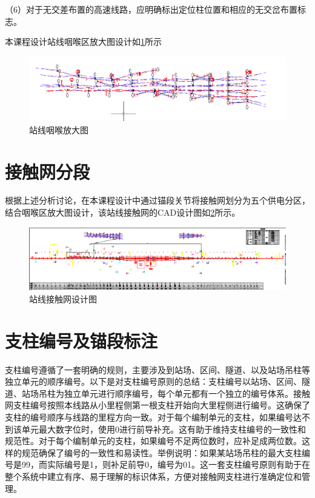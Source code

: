 （6）对于无交差布置的高速线路，应明确标出定位柱位置和相应的无交岔布置标志。

本课程设计站线咽喉区放大图设计如\ref{fig:站线咽喉放大图}所示
\begin{figure}[H]
	\centering
	\includegraphics[width=0.7\linewidth]{figures/站线咽喉放大图}
	\caption{站线咽喉放大图}
	\label{fig:站线咽喉放大图}
\end{figure}

\section{接触网分段}
根据上述分析讨论，在本课程设计中通过锚段关节将接触网划分为五个供电分区，结合咽喉区放大图设计，该站线接触网的CAD设计图如\ref{fig:站线接触网设计图}所示。
\begin{figure}[H]
	\centering
	\includegraphics[width=0.7\linewidth]{figures/站线接触网设计图}
	\caption{站线接触网设计图}
	\label{fig:站线接触网设计图}
\end{figure}

\section{支柱编号及锚段标注}
支柱编号遵循了一套明确的规则，主要涉及到站场、区间、隧道、以及站场吊柱等独立单元的顺序编号。以下是对支柱编号原则的总结：支柱编号以站场、区间、隧道、站场吊柱为独立单元进行顺序编号，每个单元都有一个独立的编号体系。接触网支柱编号按照本线路从小里程侧第一根支柱开始向大里程侧进行编号。这确保了支柱的编号顺序与线路的里程方向一致。对于每个编制单元的支柱，如果编号达不到该单元最大数字位时，使用0进行前导补充。这有助于维持支柱编号的一致性和规范性。对于每个编制单元的支柱，如果编号不足两位数时，应补足成两位数。这样的规范确保了编号的一致性和易读性。举例说明：如果某站场吊柱的最大支柱编号是99，而实际编号是1，则补足前导0，编号为01。这一套支柱编号原则有助于在整个系统中建立有序、易于理解的标识体系，方便对接触网支柱进行准确定位和管理。
